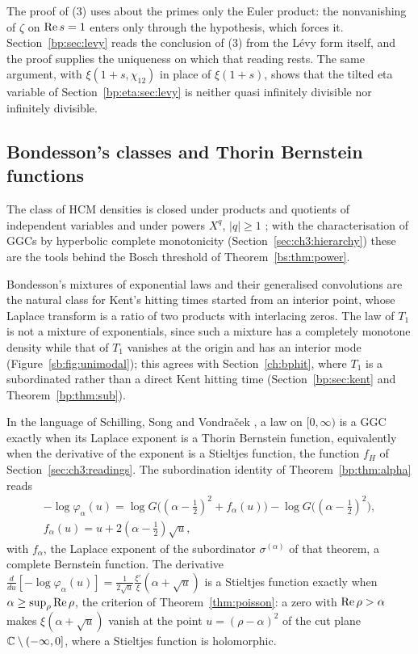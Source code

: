 The proof of (3) uses about the primes only the Euler product: the nonvanishing of $\zeta$ on $\operatorname{Re} s=1$ enters only through the hypothesis, which forces it. Section~\ref{bp:sec:levy} reads the conclusion of (3) from the L\'evy form itself, and the proof supplies the uniqueness on which that reading rests. The same argument, with $\xi(1+s,\chi_{12})$ in place of $\xi(1+s)$, shows that the tilted eta variable of Section~\ref{bp:eta:sec:levy} is neither quasi infinitely divisible nor infinitely divisible.

\subsection{Bondesson's classes and Thorin Bernstein functions}\label{sb:sec:bernstein}

The class of HCM densities is closed under products and quotients of independent variables and under powers $X^q$, $|q|\ge1$ \cite[Section 5.1]{Bondesson}; with the characterisation of GGCs by hyperbolic complete monotonicity \cite[Theorem 6.1.1]{Bondesson} (Section~\ref{sec:ch3:hierarchy}) these are the tools behind the Bosch threshold of Theorem~\ref{bs:thm:power}.

Bondesson's mixtures of exponential laws and their generalised convolutions are the natural class for Kent's hitting times started from an interior point, whose Laplace transform is a ratio of two products with interlacing zeros. The law of $T_1$ is not a mixture of exponentials, since such a mixture has a completely monotone density while that of $T_1$ vanishes at the origin and has an interior mode (Figure~\ref{sb:fig:unimodal}); this agrees with Section~\ref{ch:bphit}, where $T_1$ is a subordinated rather than a direct Kent hitting time (Section~\ref{bp:sec:kent} and Theorem~\ref{bp:thm:sub}).

In the language of Schilling, Song and Vondra\v{c}ek \cite[Definition 9.10]{boSSV}, a law on $[0,\infty)$ is a GGC exactly when its Laplace exponent is a Thorin Bernstein function, equivalently when the derivative of the exponent is a Stieltjes function, the function $f_H$ of Section~\ref{sec:ch3:readings}. The subordination identity of Theorem~\ref{bp:thm:alpha} reads
\begin{equation}\label{sb:eq:comp}
\begin{gathered}
-\log\varphi_\alpha(u)=\log G\big((\alpha-\tfrac12)^2+f_\alpha(u)\big)-\log G\big((\alpha-\tfrac12)^2\big),\\
f_\alpha(u)=u+2(\alpha-\tfrac12)\sqrt u,
\end{gathered}
\end{equation}
with $f_\alpha$, the Laplace exponent of the subordinator $\sigma^{(\alpha)}$ of that theorem, a complete Bernstein function. The derivative $\frac{d}{du}[-\log\varphi_\alpha(u)]=\frac1{2\sqrt u}\frac{\xi'}{\xi}(\alpha+\sqrt u)$ is a Stieltjes function exactly when $\alpha\ge\sup_\rho\operatorname{Re}\rho$, the criterion of Theorem~\ref{thm:poisson}: a zero with $\operatorname{Re}\rho>\alpha$ makes $\xi(\alpha+\sqrt u)$ vanish at the point $u=(\rho-\alpha)^2$ of the cut plane $\mathbb{C}\setminus(-\infty,0]$, where a Stieltjes function is holomorphic.

